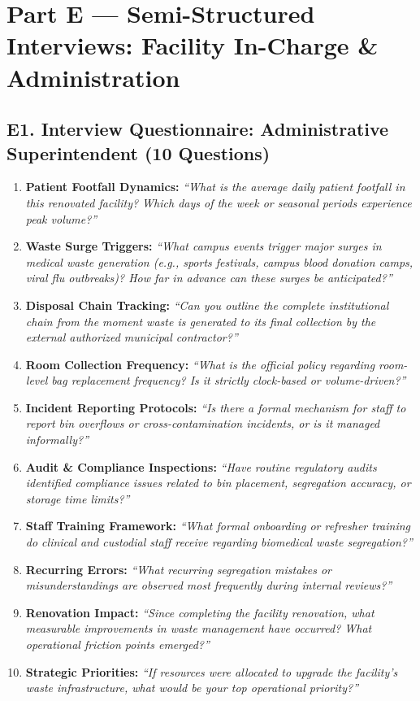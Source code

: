 \documentclass[11pt,a4paper]{article}
\begin{document}
\section{Part E --- Semi-Structured Interviews: Facility In-Charge \& Administration}

\subsection{E1. Interview Questionnaire: Administrative Superintendent (10 Questions)}
\begin{enumerate}[leftmargin=*, itemsep=3pt]
    \item \textbf{Patient Footfall Dynamics:} \emph{``What is the average daily patient footfall in this renovated facility? Which days of the week or seasonal periods experience peak volume?''}
    \item \textbf{Waste Surge Triggers:} \emph{``What campus events trigger major surges in medical waste generation (e.g., sports festivals, campus blood donation camps, viral flu outbreaks)? How far in advance can these surges be anticipated?''}
    \item \textbf{Disposal Chain Tracking:} \emph{``Can you outline the complete institutional chain from the moment waste is generated to its final collection by the external authorized municipal contractor?''}
    \item \textbf{Room Collection Frequency:} \emph{``What is the official policy regarding room-level bag replacement frequency? Is it strictly clock-based or volume-driven?''}
    \item \textbf{Incident Reporting Protocols:} \emph{``Is there a formal mechanism for staff to report bin overflows or cross-contamination incidents, or is it managed informally?''}
    \item \textbf{Audit \& Compliance Inspections:} \emph{``Have routine regulatory audits identified compliance issues related to bin placement, segregation accuracy, or storage time limits?''}
    \item \textbf{Staff Training Framework:} \emph{``What formal onboarding or refresher training do clinical and custodial staff receive regarding biomedical waste segregation?''}
    \item \textbf{Recurring Errors:} \emph{``What recurring segregation mistakes or misunderstandings are observed most frequently during internal reviews?''}
    \item \textbf{Renovation Impact:} \emph{``Since completing the facility renovation, what measurable improvements in waste management have occurred? What operational friction points emerged?''}
    \item \textbf{Strategic Priorities:} \emph{``If resources were allocated to upgrade the facility's waste infrastructure, what would be your top operational priority?''}
\end{enumerate}
\end{document}
